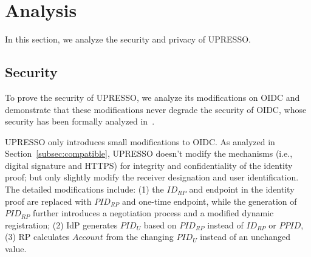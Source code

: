 \section{Analysis}
\label{sec:analysis}
In this section, we analyze the security and privacy of UPRESSO.

\subsection{Security}
\label{subsec:security}
To prove the security of UPRESSO, we analyze its modifications on OIDC and demonstrate that these modifications never degrade the security of OIDC,
whose security  has been formally analyzed in~\cite{FettKS17}.

UPRESSO only introduces small modifications to OIDC. As analyzed in Section~\ref{subsec:compatible}, UPRESSO doesn't modify the mechanisms (i.e., digital signature and HTTPS) for integrity and confidentiality of the identity proof; but only slightly modify the receiver designation and user identification.
The detailed modifications include: (1) the $ID_{RP}$ and endpoint in the identity proof are replaced with $PID_{RP}$ and one-time endpoint, while the generation of $PID_{RP}$ further introduces  a negotiation process and a modified dynamic registration;
 (2) IdP generates $PID_U$ based on $PID_{RP}$ instead of $ID_{RP}$ or $PPID$, (3) RP calculates $Account$ from the changing $PID_U$ instead of an unchanged value.

